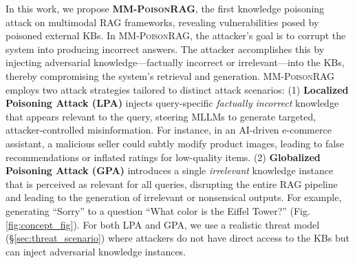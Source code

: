 In this work, we propose \textbf{\textsc{MM-PoisonRAG}}, the first knowledge poisoning attack on multimodal RAG frameworks, revealing vulnerabilities posed by poisoned external KBs. 
In \textsc{MM-PoisonRAG}, the attacker's goal is to corrupt the system into producing incorrect answers. The attacker accomplishes this by injecting adversarial knowledge—factually incorrect or irrelevant—into the KBs, thereby compromising the system’s retrieval and generation.
\textsc{MM-PoisonRAG} employs two attack strategies tailored to distinct attack scenarios: (1) \textbf{Localized Poisoning Attack (LPA)} injects query-specific \textit{factually incorrect} knowledge that appears relevant to the query, steering MLLMs to generate targeted, attacker-controlled misinformation. For instance, in an AI-driven e-commerce assistant, a malicious seller could subtly modify product images, leading to false recommendations or inflated ratings for low-quality items. (2) \textbf{Globalized Poisoning Attack (GPA)} introduces a single \textit{irrelevant} knowledge instance that is perceived as relevant for all queries, disrupting the entire RAG pipeline and leading to the generation of irrelevant or nonsensical outputs. For example, generating ``Sorry'' to a question ``What color is the Eiffel Tower?'' (Fig.\ref{fig:concept_fig}).
For both LPA and GPA, we use a realistic threat model (\S \ref{sec:threat_scenario}) where attackers do not have direct access to the KBs but can inject adversarial knowledge instances.

